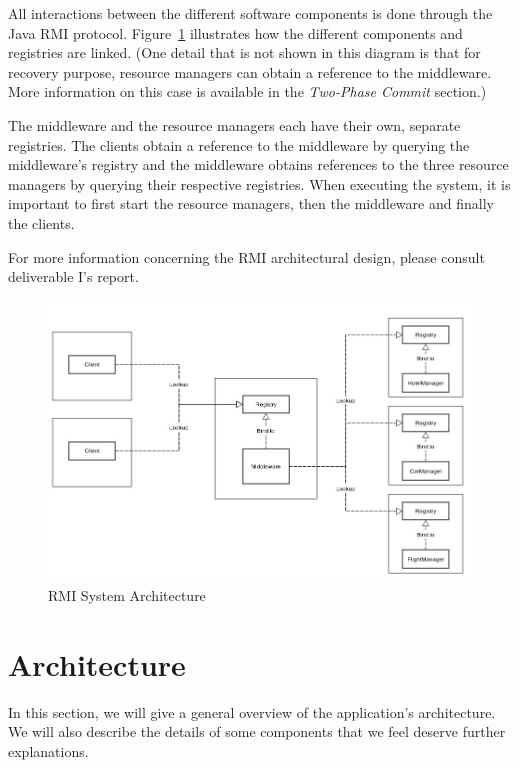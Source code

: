 \documentclass[11pt]{article}
\begin{document}
All interactions between the different software components is done
through the Java RMI protocol.  Figure~\ref{fig:rmi} illustrates how
the different components and registries are linked.  (One detail that
is not shown in this diagram is that for recovery purpose, resource
managers can obtain a reference to the middleware.  More information
on this case is available in the {\it Two-Phase Commit} section.)

The middleware and the resource managers each have their own, separate
registries.  The clients obtain a reference to the middleware by
querying the middleware's registry and the middleware obtains
references to the three resource managers by querying their respective
registries.  When executing the system, it is important to first start
the resource managers, then the middleware and finally the clients.

For more information concerning the RMI architectural design, please
consult deliverable I's report.

\begin{figure}[H]
  \caption{RMI System Architecture}
  \label{fig:rmi}

  \begin{center}
    \includegraphics[scale=0.5]{rmi.jpg}
  \end{center}
\end{figure}



\section{Architecture}

In this section, we will give a general overview of the application's
architecture.  We will also describe the details of some components
that we feel deserve further explanations.
\end{document}
